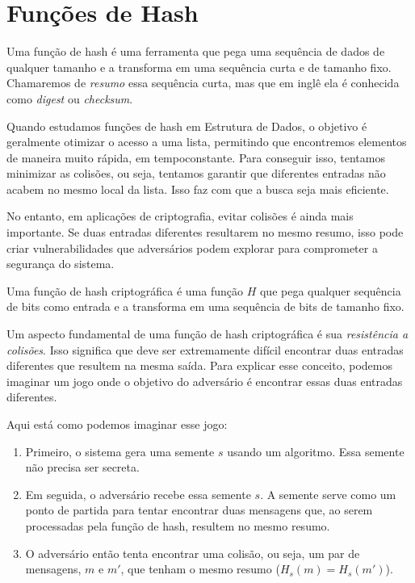 \chapter{Funções de Hash}
\label{cha:hash}

Uma função de hash é uma ferramenta que pega uma sequência de dados de qualquer tamanho e a transforma em uma sequência curta e de tamanho fixo.
Chamaremos de {\em resumo} essa sequência curta, mas que em inglê ela é conhecida como {\em digest} ou {\em checksum}.

Quando estudamos funções de hash em Estrutura de Dados, o objetivo é geralmente otimizar o acesso a uma lista, permitindo que encontremos elementos de maneira muito rápida, em tempoconstante.
Para conseguir isso, tentamos minimizar as colisões, ou seja, tentamos garantir que diferentes entradas não acabem no mesmo local da lista. Isso faz com que a busca seja mais eficiente.

No entanto, em aplicações de criptografia, evitar colisões é ainda mais importante.
Se duas entradas diferentes resultarem no mesmo resumo, isso pode criar vulnerabilidades que adversários podem explorar para comprometer a segurança do sistema.

Uma função de hash criptográfica é uma função $H$ que pega qualquer sequência de bits como entrada e a transforma em uma sequência de bits de tamanho fixo.

Um aspecto fundamental de uma função de hash criptográfica é sua {\em resistência a colisões}.
Isso significa que deve ser extremamente difícil encontrar duas entradas diferentes que resultem na mesma saída.
Para explicar esse conceito, podemos imaginar um jogo onde o objetivo do adversário é encontrar essas duas entradas diferentes.

Aqui está como podemos imaginar esse jogo:
\begin{enumerate}
\item Primeiro, o sistema gera uma semente $s$ usando um algoritmo.
  Essa semente não precisa ser secreta.
    
\item Em seguida, o adversário recebe essa semente $s$.
  A semente serve como um ponto de partida para tentar encontrar duas mensagens que, ao serem processadas pela função de hash, resultem no mesmo resumo.
    
\item O adversário então tenta encontrar uma colisão, ou seja, um par de mensagens, $m$ e $m'$, que tenham o mesmo resumo ($H_s(m) = H_s(m')$).
\end{enumerate}

